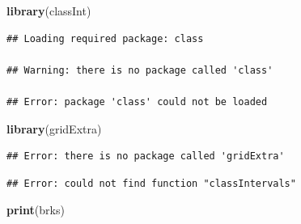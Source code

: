 \documentclass[]{article}
\newenvironment{Shaded}{}{}
\newcommand{\KeywordTok}[1]{\textcolor[rgb]{0.00,0.44,0.13}{\textbf{{#1}}}}
\newcommand{\DataTypeTok}[1]{\textcolor[rgb]{0.56,0.13,0.00}{{#1}}}
\newcommand{\DecValTok}[1]{\textcolor[rgb]{0.25,0.63,0.44}{{#1}}}
\newcommand{\StringTok}[1]{\textcolor[rgb]{0.25,0.44,0.63}{{#1}}}
\newcommand{\CommentTok}[1]{\textcolor[rgb]{0.38,0.63,0.69}{\textit{{#1}}}}
\newcommand{\NormalTok}[1]{{#1}}
\begin{document}
\begin{Shaded}
\begin{Highlighting}[]
\KeywordTok{library}\NormalTok{(classInt)}
\end{Highlighting}
\end{Shaded}

\begin{verbatim}
## Loading required package: class

## Warning: there is no package called 'class'

## Error: package 'class' could not be loaded
\end{verbatim}

\begin{Shaded}
\begin{Highlighting}[]
\KeywordTok{library}\NormalTok{(gridExtra)}
\end{Highlighting}
\end{Shaded}

\begin{verbatim}
## Error: there is no package called 'gridExtra'
\end{verbatim}

\begin{Shaded}
\end{Shaded}

\begin{verbatim}
## Error: could not find function "classIntervals"
\end{verbatim}

\begin{Shaded}
\begin{Highlighting}[]

\KeywordTok{print}\NormalTok{(brks)}
\end{Highlighting}
\end{Shaded}
\end{document}
